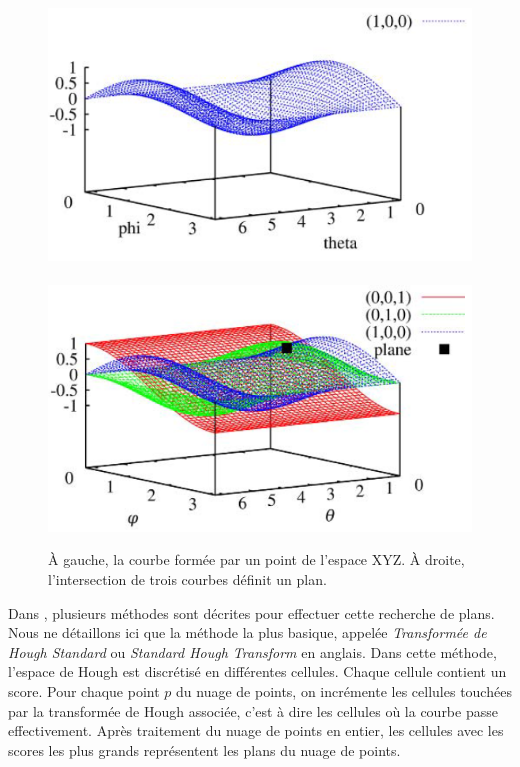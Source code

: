 ﻿\documentclass[12pt, twoside]{article}
\begin{document}
\begin{figure}[h]
\centering
\includegraphics[scale=0.5]{HoughCurv1.png}~\includegraphics[scale=0.5]{HoughCurv0.png}
\caption{\label{fig:Hough2} À gauche, la courbe formée par un point de l’espace XYZ. À droite, l’intersection de trois courbes définit un plan.}
\end{figure}

Dans \cite{Hough1}, plusieurs méthodes sont décrites pour effectuer cette recherche de plans. Nous ne détaillons ici que la méthode la plus basique, appelée \textit{Transformée de Hough Standard} ou \textit{Standard Hough Transform} en anglais. Dans cette méthode, l'espace de Hough est discrétisé en différentes cellules. Chaque cellule contient un score. Pour chaque point $p$ du nuage de points, on incrémente les cellules touchées par la transformée de Hough associée, c'est à dire les cellules où la courbe passe effectivement. Après traitement du nuage de points en entier, les cellules avec les scores les plus grands représentent les plans du nuage de points.
\end{document}
